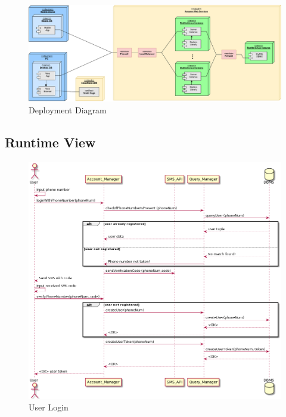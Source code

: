 \begin{figure}[H]
    \includegraphics[width=\linewidth]{images/draw.io/deployment_structure.pdf}
    \caption{Deployment Diagram}
    \label{fig:deployment_structure}
\end{figure}

\subsection{Runtime View}

\begin{figure}[H]
    \includegraphics[width=\linewidth]{uml/seq_user_login.png}
    \caption{User Login}
    \label{fig:seq_user_login}
\end{figure}

